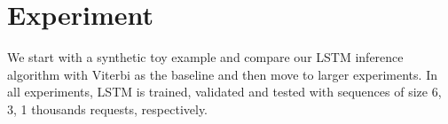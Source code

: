 	\section{Experiment}

	
	
	
	
	We start with a synthetic toy example and compare our LSTM inference algorithm with Viterbi as the baseline and then move to larger experiments.
	In all experiments, LSTM is trained, validated and tested with sequences of size 6, 3, 1 thousands requests, respectively. 
	
	
